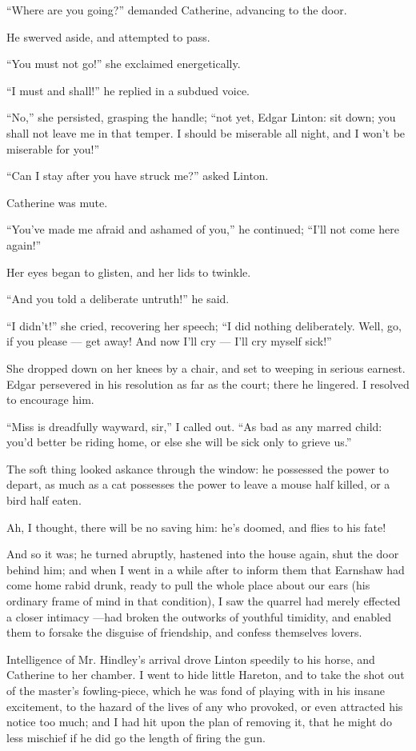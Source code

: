 \par “Where are you going?” demanded Catherine, advancing to the door.
\par He swerved aside, and attempted to pass.
\par “You must not go!” she exclaimed energetically.
\par “I must and shall!” he replied in a subdued voice.
\par “No,” she persisted, grasping the handle; “not yet, Edgar Linton: sit down; you shall not leave me in that temper. I should be miserable all night, and I won't be miserable for you!”
\par “Can I stay after you have struck me?” asked Linton.
\par Catherine was mute.
\par “You've made me afraid and ashamed of you,” he continued; “I'll not come here again!”
\par Her eyes began to glisten, and her lids to twinkle.
\par “And you told a deliberate untruth!” he said.
\par “I didn't!” she cried, recovering her speech; “I did nothing deliberately. Well, go, if you please — get away! And now I'll cry — I'll cry myself sick!”
\par She dropped down on her knees by a chair, and set to weeping in serious earnest. Edgar persevered in his resolution as far as the court; there he lingered. I resolved to encourage him.
\par “Miss is dreadfully wayward, sir,” I called out. “As bad as any marred child: you'd better be riding home, or else she will be sick only to grieve us.”
\par The soft thing looked askance through the window: he possessed the power to depart, as much as a cat possesses the power to leave a mouse half killed, or a bird half eaten.
\par Ah, I thought, there will be no saving him: he's doomed, and flies to his fate!
\par And so it was; he turned abruptly, hastened into the house again, shut the door behind him; and when I went in a while after to inform them that Earnshaw had come home rabid drunk, ready to pull the whole place about our ears (his ordinary frame of mind in that condition), I saw the quarrel had merely effected a closer intimacy —had broken the outworks of youthful timidity, and enabled them to forsake the disguise of friendship, and confess themselves lovers.
\par Intelligence of Mr. Hindley's arrival drove Linton speedily to his horse, and Catherine to her chamber. I went to hide little Hareton, and to take the shot out of the master's fowling-piece, which he was fond of playing with in his insane excitement, to the hazard of the lives of any who provoked, or even attracted his notice too much; and I had hit upon the plan of removing it, that he might do less mischief if he did go the length of firing the gun.








